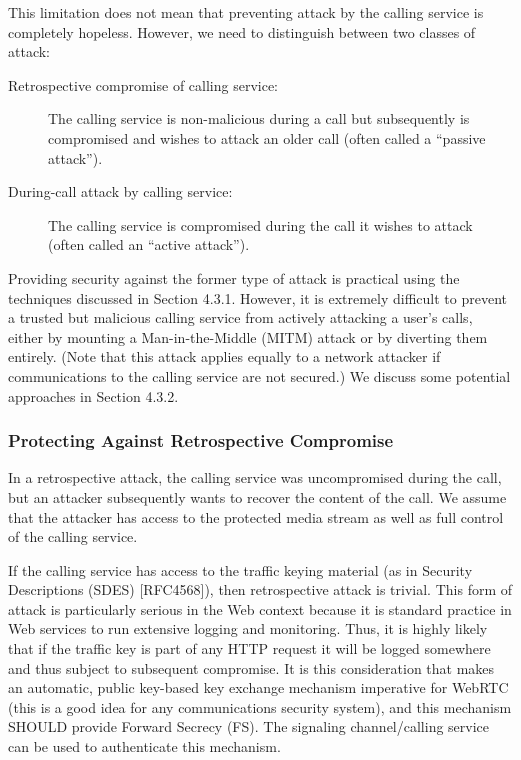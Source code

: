 \documentclass{article}
\begin{document}
This limitation does not mean that preventing attack by the calling
service is completely hopeless.  However, we need to distinguish
between two classes of attack:

\begin{description}
\item[Retrospective compromise of calling service:]
   The calling service is non-malicious during a call but
   subsequently is compromised and wishes to attack an older call
   (often called a ``passive attack'').

\item[During-call attack by calling service:]
   The calling service is compromised during the call it wishes to
   attack (often called an ``active attack'').
\end{description}

Providing security against the former type of attack is practical
using the techniques discussed in Section 4.3.1.  However, it is
extremely difficult to prevent a trusted but malicious calling
service from actively attacking a user's calls, either by mounting a
Man-in-the-Middle (MITM) attack or by diverting them entirely.  (Note
that this attack applies equally to a network attacker if
communications to the calling service are not secured.)  We discuss
some potential approaches in Section 4.3.2.

\subsubsection{Protecting Against Retrospective Compromise}

In a retrospective attack, the calling service was uncompromised
during the call, but an attacker subsequently wants to recover the
content of the call.  We assume that the attacker has access to the
protected media stream as well as full control of the calling
service.

If the calling service has access to the traffic keying material (as
in Security Descriptions (SDES) [RFC4568]), then retrospective attack
is trivial.  This form of attack is particularly serious in the Web
context because it is standard practice in Web services to run
extensive logging and monitoring.  Thus, it is highly likely that if
the traffic key is part of any HTTP request it will be logged
somewhere and thus subject to subsequent compromise.  It is this
consideration that makes an automatic, public key-based key exchange
mechanism imperative for WebRTC (this is a good idea for any
communications security system), and this mechanism SHOULD provide
Forward Secrecy (FS).  The signaling channel/calling service can be
used to authenticate this mechanism.
\end{document}
